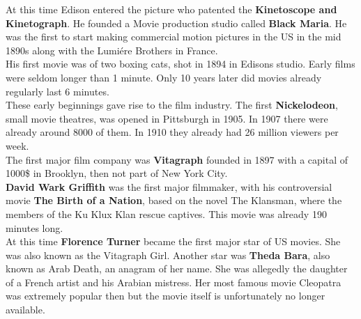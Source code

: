 \documentclass{article}
\begin{document}
	At this time Edison entered the picture who patented the \textbf{Kinetoscope and Kinetograph}. He founded a Movie production studio called \textbf{Black Maria}. He was the first to start making commercial motion pictures in the US in the mid 1890s along with the Lumiére Brothers in France. \\
	His first movie was of two boxing cats, shot in 1894 in Edisons studio. Early films were seldom longer than 1 minute. Only 10 years later did movies already regularly last 6 minutes. \\
	These early beginnings gave rise to the film industry. The first \textbf{Nickelodeon}, small movie theatres, was opened in Pittsburgh in 1905. In 1907 there were already around 8000 of them. In 1910 they already had 26 million viewers per week. \\
	The first major film company was \textbf{Vitagraph} founded in 1897 with a capital of 1000\$ in Brooklyn, then not part of New York City. \\
	\textbf{David Wark Griffith} was the first major filmmaker, with his controversial movie \textbf{The Birth of a Nation}, based on the novel The Klansman, where the members of the Ku Klux Klan rescue captives. This movie was already 190 minutes long. \\
	At this time \textbf{Florence Turner} became the first major star of US movies. She was also known as the Vitagraph Girl. Another star was \textbf{Theda Bara}, also known as Arab Death, an anagram of her name. She was allegedly the daughter of a French artist and his Arabian mistress. Her most famous movie Cleopatra was extremely popular then but the movie itself is unfortunately no longer available. \\
\end{document}
